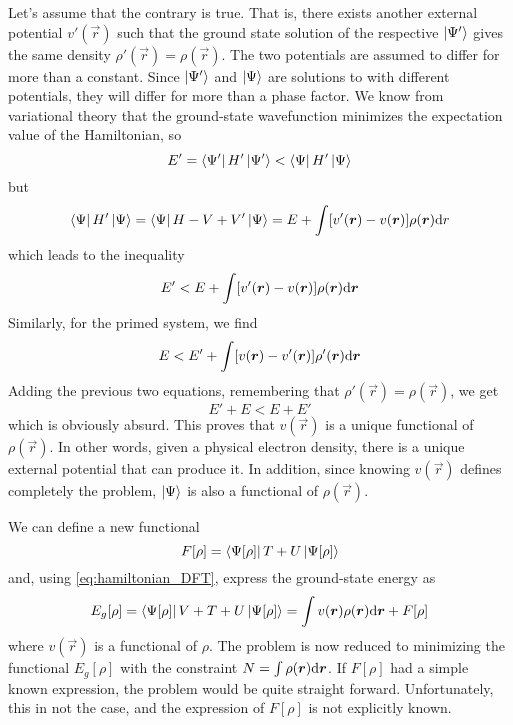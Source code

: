 Let's assume that the contrary is true. That is, there exists another external potential $v'(\vec{r})$ such that the ground state solution of the respective \sche $\ket{\Psi'}$ gives the same density $\rho'(\vec{r}) = \rho(\vec{r})$. The two potentials are assumed to differ for more than a constant. Since $\ket{\Psi'}$ and $\ket{\Psi}$ are solutions to \sches with different potentials, they will differ for more than a phase factor. We know from variational theory that the ground-state wavefunction minimizes the expectation value of the Hamiltonian, so
\begin{equation}
    E' = \bra{\Psi'} H' \ket{\Psi'} < \bra{\Psi} H' \ket{\Psi}
\end{equation}
but
\begin{equation}
    \bra{\Psi} H' \ket{\Psi} = \bra{\Psi} H - V + V' \ket{\Psi} = E + \int [v'(\vec{r}) - v(\vec{r})] \rho(\vec{r}) \differential r
\end{equation}
which leads to the inequality
\begin{equation}
    E' < E + \int [v'(\vec{r}) - v(\vec{r})] \rho(\vec{r}) \differential \vec{r}
\end{equation}
Similarly, for the primed system, we find
\begin{equation}
    E < E' + \int [v(\vec{r}) - v'(\vec{r})] \rho'(\vec{r}) \differential \vec{r}
\end{equation}
Adding the previous two equations, remembering that $\rho'(\vec{r}) = \rho(\vec{r})$, we get
\begin{equation}
    E' + E < E + E'
\end{equation}
which is obviously absurd. This proves that $v(\vec{r})$ is a unique functional of $\rho(\vec{r})$. In other words, given a physical electron density, there is a unique external potential that can produce it. In addition, since knowing $v(\vec{r})$ defines completely the problem, $\ket{\Psi}$ is also a functional of $\rho(\vec{r})$.

We can define a new functional
\begin{equation}
    F[\rho] = \bra{\Psi[\rho]} T+U \ket{\Psi[\rho]}
\end{equation}
and, using \cref{eq:hamiltonian_DFT}, express the ground-state energy as
\begin{equation} \label{eq:ground_functional}
    E_g[\rho] = \bra{\Psi[\rho]} V+T+U \ket{\Psi[\rho]} = \int v(\vec{r}) \rho(\vec{r}) \differential \vec{r} + F[\rho]
\end{equation}
where $v(\vec{r})$ is a functional of $\rho$. The problem is now reduced to minimizing the functional $E_g[\rho]$ with the constraint $N = \int \rho(\vec{r}) \differential \vec{r}$. If $F[\rho]$ had a simple known expression, the problem would be quite straight forward. Unfortunately, this in not the case, and the expression of $F[\rho]$ is not explicitly known.

